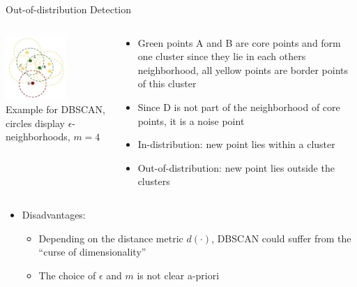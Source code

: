 \documentclass[10pt,compress,t,notes=noshow, xcolor=table]{beamer}
\begin{document}
\begin{frame}[c]{Out-of-distribution Detection}
\vspace{-0.6cm}
\begin{columns}[totalwidth=\textwidth]

	\begin{column}{0.5\textwidth}
	    \vspace{-2em}
		\begin{center}
			\includegraphics[width=0.6\textwidth]{figure/dbscan.jpg}\\
			\tiny{Example for DBSCAN, circles display $\epsilon$-neighborhoods, $m = 4$}
		\end{center}
	\end{column}

	\begin{column}{0.5\textwidth}
	
		\begin{itemize}
			\item Green points A and B are core points and form one cluster since they lie in each others neighborhood, all yellow points are border points of this cluster 
			\pause
			\item Since D is not part of the neighborhood of core points, it is a noise point 
			\pause
			\item In-distribution: new point lies within a cluster
			\pause
		    \item Out-of-distribution: new point lies outside the clusters 
		\end{itemize}
	\end{column}

\end{columns}

\pause

\hspace{1em}
\begin{itemize}
		\item Disadvantages:
		\begin{itemize}
		    \item Depending on the distance metric $d(\cdot)$, DBSCAN could suffer from the ``curse of dimensionality'' 
		    \item The choice of $\epsilon$ and $m$ is not clear a-priori 
		\end{itemize}
\end{itemize}
\end{frame}
\end{document}
